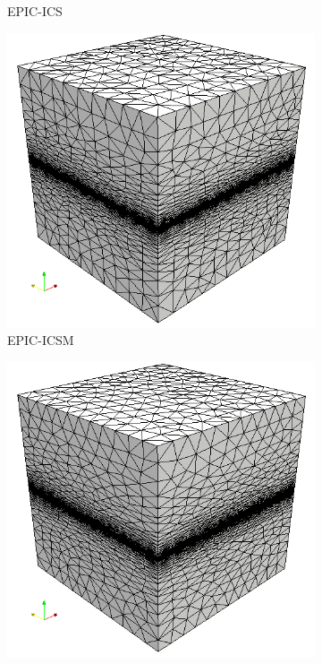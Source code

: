 \documentclass[3p,times,procedia,number]{elsarticle}
\begin{document}
\begin{figure}
\begin{subfigure}{.24\textwidth}
\caption{EPIC-ICS}
\end{subfigure}
\begin{subfigure}{.24\textwidth}
\centering
\includegraphics[width=\textwidth]{epic-icsm-cube-linear.png}
\caption{EPIC-ICSM}
\end{subfigure}
\begin{subfigure}{.24\textwidth}
\centering
\includegraphics[width=\textwidth]{fefloa-cube-linear.png}

\end{subfigure}
\end{figure}
\end{document}
